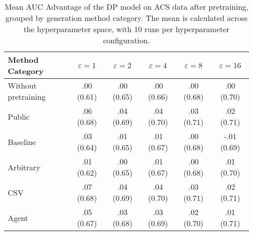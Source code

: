 \begin{table}[h!]
    \centering
    \caption{Mean AUC Advantage of the DP model on ACS data after pretraining, grouped by generation method category. The mean is calculated across the hyperparameter space, with 10 runs per hyperparameter configuration.}
    \label{tab:epsilon_comparison}
    \begin{tabular}{lccccc}
    \toprule
    Method Category & $\varepsilon=1$ & $\varepsilon=2$ & $\varepsilon=4$ & $\varepsilon=8$ & $\varepsilon=16$ \\
    \midrule
    Without pretraining & .00 {\small (0.61)} & .00 {\small (0.65)} & .00 {\small (0.66)} & .00 {\small (0.68)} & .00 {\small (0.70)} \\
    \arrayrulecolor{black!50!}\midrule
    Public & \cellcolor{silver!30}.06 {\small (0.68)} & \cellcolor{silver!30}.04 {\small (0.69)} & \cellcolor{silver!30}.04 {\small (0.70)} & \cellcolor{silver!30}.03 {\small (0.71)} & \cellcolor{gold!30}.02 {\small (0.71)} \\
    \arrayrulecolor{black!50!}\midrule
    Baseline & .03 {\small (0.64)} & .01 {\small (0.65)} & .01 {\small (0.67)} & .00 {\small (0.68)} & -.01 {\small (0.69)} \\
    \arrayrulecolor{black!50!}\midrule
    Arbitrary & .01 {\small (0.62)} & .00 {\small (0.65)} & .01 {\small (0.67)} & .00 {\small (0.68)} & .01 {\small (0.70)} \\
    \arrayrulecolor{black!50!}\midrule
    CSV & \cellcolor{gold!30}.07 {\small (0.68)} & \cellcolor{gold!30}.04 {\small (0.69)} & \cellcolor{gold!30}.04 {\small (0.70)} & \cellcolor{gold!30}.03 {\small (0.71)} & \cellcolor{silver!30}.02 {\small (0.71)} \\
    Agent & \cellcolor{bronze!30}.05 {\small (0.67)} & \cellcolor{bronze!30}.03 {\small (0.68)} & \cellcolor{bronze!30}.03 {\small (0.69)} & \cellcolor{bronze!30}.02 {\small (0.70)} & \cellcolor{bronze!30}.01 {\small (0.71)} \\
    \bottomrule
    \end{tabular}
\end{table}
